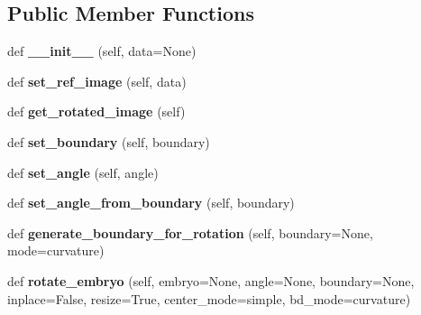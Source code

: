 \subsection*{Public Member Functions}
\begin{DoxyCompactItemize}
\item 
\mbox{\label{class_rotation_1_1_rotation_ad54e8295b9712b1d2428faeadc838dcb}} 
def {\bfseries \+\_\+\+\_\+init\+\_\+\+\_\+} (self, data=None)
\item 
\mbox{\label{class_rotation_1_1_rotation_a082ba4a8bf8a15b500360d3fddded153}} 
def {\bfseries set\+\_\+ref\+\_\+image} (self, data)
\item 
\mbox{\label{class_rotation_1_1_rotation_a9df74ce9954629900cee5f9e18871f06}} 
def {\bfseries get\+\_\+rotated\+\_\+image} (self)
\item 
\mbox{\label{class_rotation_1_1_rotation_af71e9f156a626f28ab8611538668441d}} 
def {\bfseries set\+\_\+boundary} (self, boundary)
\item 
\mbox{\label{class_rotation_1_1_rotation_ad95c26a0fa14a5759e78c5be0bd56a54}} 
def {\bfseries set\+\_\+angle} (self, angle)
\item 
\mbox{\label{class_rotation_1_1_rotation_aacbbbcddc77252653d3942a1a5d15a3f}} 
def {\bfseries set\+\_\+angle\+\_\+from\+\_\+boundary} (self, boundary)
\item 
\mbox{\label{class_rotation_1_1_rotation_a3c32cef72cf13f255208e4df99ff2bb0}} 
def {\bfseries generate\+\_\+boundary\+\_\+for\+\_\+rotation} (self, boundary=None, mode=\textquotesingle{}curvature\textquotesingle{})
\item 
\mbox{\label{class_rotation_1_1_rotation_a476d5fd93a0b7e2cb27a24348d753d5c}} 
def {\bfseries rotate\+\_\+embryo} (self, embryo=None, angle=None, boundary=None, inplace=False, resize=True, center\+\_\+mode=\textquotesingle{}simple\textquotesingle{}, bd\+\_\+mode=\textquotesingle{}curvature\textquotesingle{})
\end{DoxyCompactItemize}
